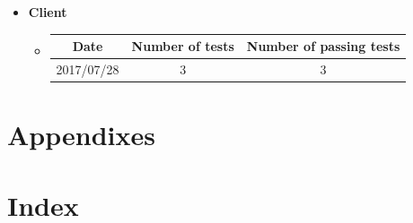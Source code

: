 \documentclass[a4paper,12pt]{article}
\begin{document}
	\begin{itemize}
 		\item \textbf{Client}
 		\begin{itemize}
 			\item
 			\begin{tabular}{ |c|c|c| } 
 				\hline
 				Date & Number of tests & Number of passing tests \\
 				\hline
 				2017/07/28 & 3 & 3\\
 				\hline
 			\end{tabular}
 		\end{itemize}
 	\end{itemize}  
   
    \section{Appendixes}
    
    \section{Index}
    \pagebreak  
\end{document}
